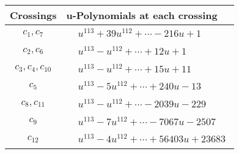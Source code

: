 \documentclass[1p]{elsarticle_modified}
\theoremstyle{definition}
\begin{document}
\begin{tabular}{m{50pt}|m{274pt}}
Crossings & \hspace{64pt}u-Polynomials at each crossing \\
\hline $$\begin{aligned}c_{1},c_{7}\end{aligned}$$&$\begin{aligned}
&u^{113}+39 u^{112}+\cdots-216 u+1
\end{aligned}$\\
\hline $$\begin{aligned}c_{2},c_{6}\end{aligned}$$&$\begin{aligned}
&u^{113}- u^{112}+\cdots+12 u+1
\end{aligned}$\\
\hline $$\begin{aligned}c_{3},c_{4},c_{10}\end{aligned}$$&$\begin{aligned}
&u^{113}- u^{112}+\cdots+15 u+11
\end{aligned}$\\
\hline $$\begin{aligned}c_{5}\end{aligned}$$&$\begin{aligned}
&u^{113}-5 u^{112}+\cdots+240 u-13
\end{aligned}$\\
\hline $$\begin{aligned}c_{8},c_{11}\end{aligned}$$&$\begin{aligned}
&u^{113}- u^{112}+\cdots-2039 u-229
\end{aligned}$\\
\hline $$\begin{aligned}c_{9}\end{aligned}$$&$\begin{aligned}
&u^{113}-7 u^{112}+\cdots-7067 u-2507
\end{aligned}$\\
\hline $$\begin{aligned}c_{12}\end{aligned}$$&$\begin{aligned}
&u^{113}-4 u^{112}+\cdots+56403 u+23683
\end{aligned}$\\
\hline
\end{tabular}\\~\\
\newpage\renewcommand{\arraystretch}{1}
\end{document}
